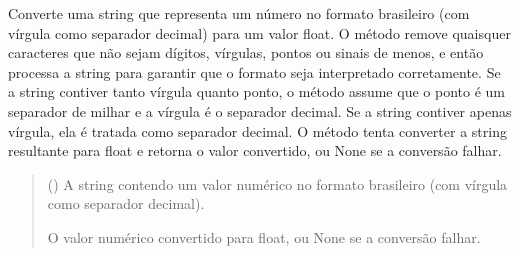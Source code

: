 \documentclass[letterpaper,10pt,english]{sphinxmanual}
\begin{document}
\begin{fulllineitems}
\label{\detokenize{api/formatters:formatters.parse_decimal_br}}
\pysigstartsignatures
\pysiglinewithargsret
{}
{}
{}
\pysigstopsignatures
\sphinxAtStartPar
Converte uma string que representa um número no formato brasileiro (com vírgula como separador decimal) para um valor float. O método remove quaisquer caracteres que não sejam dígitos, vírgulas, pontos ou sinais de menos, e então processa a string para garantir que o formato seja interpretado corretamente. Se a string contiver tanto vírgula quanto ponto, o método assume que o ponto é um separador de milhar e a vírgula é o separador decimal. Se a string contiver apenas vírgula, ela é tratada como separador decimal. O método tenta converter a string resultante para float e retorna o valor convertido, ou None se a conversão falhar.
\begin{quote}\begin{description}
\sphinxAtStartPar
{} () \textendash{} A string contendo um valor numérico no formato brasileiro (com vírgula como separador decimal).

\sphinxAtStartPar
O valor numérico convertido para float, ou None se a conversão falhar.

\sphinxAtStartPar
{}

\end{description}\end{quote}

\end{fulllineitems}

\end{document}
